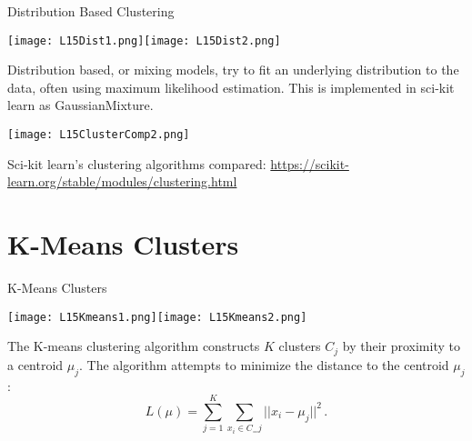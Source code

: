 \documentclass[10pt, table, dvipsnames,xcdraw,handout]{beamer}
\begin{document}
\begin{frame}[fragile]{Distribution Based Clustering}
  \begin{minipage}[t][0.5\textheight][t]{\textwidth}
	\centering \texttt{[image: L15Dist1.png]}\hspace{1em}\texttt{[image: L15Dist2.png]} 
  \end{minipage}
  \vfill
\begin{minipage}[t][0.5\textheight][t]{\textwidth}
Distribution based, or mixing models, try to fit an underlying distribution to the data, often using maximum likelihood estimation. This is implemented in sci-kit learn as GaussianMixture.\pause
\end{minipage}
\end{frame}



\begin{frame}[fragile]
  \begin{minipage}[t][0.8\textheight][t]{\textwidth}
	\centering \texttt{[image: L15ClusterComp2.png]}
  \end{minipage}
  \vfill
\begin{minipage}[t][0.2\textheight][t]{\textwidth}
Sci-kit learn's clustering algorithms compared: \url{https://scikit-learn.org/stable/modules/clustering.html}
\end{minipage}
\end{frame}







\section{K-Means Clusters}
\begin{frame}[fragile]{K-Means Clusters}
  \begin{minipage}[t][0.5\textheight][t]{\textwidth}
	\centering \texttt{[image: L15Kmeans1.png]}\hspace{1em}\texttt{[image: L15Kmeans2.png]} 
  \end{minipage}
  \vfill
\begin{minipage}[t][0.5\textheight][t]{\textwidth}
The K-means clustering algorithm constructs $K$ clusters $C_j$ by their proximity to a centroid $\mu_j$. The algorithm attempts to minimize the distance to the centroid $\mu_j$:
$$
L(\mu) = \sum_{j=1}^K\sum_{x_i\in C_=j}  ||x_i - \mu_j||^2\,.
$$
\end{minipage}
\end{frame}
\end{document}
